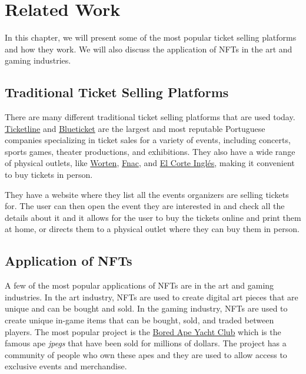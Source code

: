\section{Related Work}
\label{sec:related_work}

In this chapter, we will present some of the most popular ticket selling platforms and how they work. We will also discuss the application of NFTs in the art and gaming industries.


\subsection{Traditional Ticket Selling Platforms}
\label{subsec:traditional_ticket_selling_platforms}

There are many different traditional ticket selling platforms that are used today. \href{https://ticketline.sapo.pt/}{Ticketline} and \href{https://blueticket.meo.pt/}{Blueticket} are the largest and most reputable Portuguese companies specializing in ticket sales for a variety of events, including concerts, sports games, theater productions, and exhibitions. They also have a wide range of physical outlets, like \href{https://www.worten.pt/}{Worten}, \href{https://www.fnac.pt/}{Fnac}, and \href{https://www.elcorteingles.pt/}{El Corte Inglés}, making it convenient to buy tickets in person.

They have a website where they list all the events organizers are selling tickets for. The user can then open the event they are interested in and check all the details about it and it allows for the user to buy the tickets online and print them at home, or directs them to a physical outlet where they can buy them in person.



\subsection{Application of NFTs}
\label{subsec:application_of_nfts}

A few of the most popular applications of NFTs are in the art and gaming industries. In the art industry, NFTs are used to create digital art pieces that are unique and can be bought and sold. In the gaming industry, NFTs are used to create unique in-game items that can be bought, sold, and traded between players.
The most popular project is the \href{https://www.boredapeyachtclub.com/}{Bored Ape Yacht Club} which is the famous ape \textit{jpegs} that have been sold for millions of dollars. The project has a community of people who own these apes and they are used to allow access to exclusive events and merchandise.